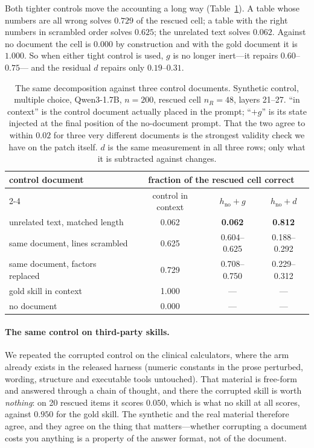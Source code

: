 \documentclass{article}
\newcommand{\dvec}{\ensuremath{d}}
\newcommand{\gvec}{\ensuremath{g}}
\begin{document}
Both tighter controls move the accounting a long way
(Table~\ref{tab:controls}). A table whose numbers are all wrong solves $0.729$
of the rescued cell; a table with the right numbers in scrambled order solves
$0.625$; the unrelated text solves $0.062$. Against no document the cell is
$0.000$ by construction and with the gold document it is $1.000$. So when either
tight control is used, $\gvec$ is no longer inert---it repairs $0.60$--$0.75$---
and the residual $\dvec$ repairs only $0.19$--$0.31$.

\begin{table}[t]
\caption{The same decomposition against three control documents. Synthetic
control, multiple choice, Qwen3-1.7B, $n=200$, rescued cell $n_R=48$, layers
21--27. ``in context'' is the control document actually placed in the prompt;
``$+\gvec$'' is its state injected at the final position of the no-document
prompt. That the two agree to within $0.02$ for three very different documents
is the strongest validity check we have on the patch itself. $\dvec$ is the
same measurement in all three rows; only what it is subtracted against changes.}
\label{tab:controls}
\centering
\small
\begin{tabular}{lccc}
\toprule
control document & \multicolumn{3}{c}{fraction of the rescued cell correct}\\
\cmidrule(lr){2-4}
 & control in context & $h_{\text{no}}+\gvec$ & $h_{\text{no}}+\dvec$ \\
\midrule
unrelated text, matched length      & 0.062 & \textbf{0.062} & \textbf{0.812} \\
same document, lines scrambled      & 0.625 & 0.604--0.625   & 0.188--0.292 \\
same document, factors replaced     & 0.729 & 0.708--0.750   & 0.229--0.312 \\
\midrule
gold skill in context & 1.000 & --- & --- \\
no document           & 0.000 & --- & --- \\
\bottomrule
\end{tabular}
\end{table}

\paragraph{The same control on third-party skills.} We repeated the corrupted
control on the clinical calculators, where the arm already exists in the
released harness (numeric constants in the prose perturbed, wording, structure
and executable tools untouched). That material is free-form and answered through
a chain of thought, and there the corrupted skill is worth \emph{nothing}: on 20
rescued items it scores $0.050$, which is what no skill at all scores, against
$0.950$ for the gold skill. The synthetic and the real material therefore agree,
and they agree on the thing that matters---whether corrupting a document costs
you anything is a property of the answer format, not of the document.
\end{document}
